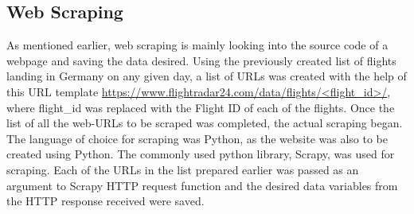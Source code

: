 \subsection{Web Scraping}
As mentioned earlier, web scraping is mainly looking into the source code of a webpage and saving the data desired. Using the previously created list of flights landing in Germany on any given day, a list of URLs was created with the help of this URL template \url{https://www.flightradar24.com/data/flights/<flight_id>/}, where flight\_id was replaced with the Flight ID of each of the flights. 
Once the list of all the web-URLs to be scraped was completed, the actual scraping began. The language of choice for scraping was Python, as the website was also to be created using Python. The commonly used python library, Scrapy, was used for scraping. Each of the URLs in the list prepared earlier was passed as an argument to Scrapy HTTP request function and the desired data variables from  the HTTP response received were saved.
 


